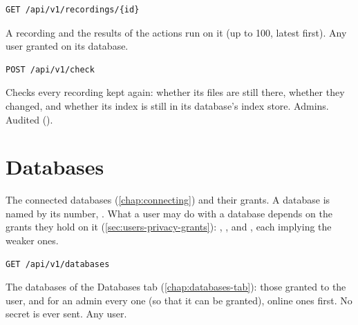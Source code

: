 \begin{lstlisting}[style=signature]
GET /api/v1/recordings/{id}
\end{lstlisting}
A recording and the results of the actions run on it (up to 100, latest first). Any user granted
 on its database.

\begin{lstlisting}[style=signature]
POST /api/v1/check
\end{lstlisting}
Checks every recording kept again: whether its files are still there, whether they changed, and
whether its index is still in its database's index store. Admins. Audited ().

\section{Databases}
\label{sec:http-api-databases}

The connected databases (\cref{chap:connecting}) and their grants. A database is named by its
number, . What a user may do with a database depends on the grants they hold on it
(\cref{sec:users-privacy-grants}): , ,  and ,
each implying the weaker ones.

\begin{lstlisting}[style=signature]
GET /api/v1/databases
\end{lstlisting}
The databases of the Databases tab (\cref{chap:databases-tab}): those granted to the user, and
for an admin every one (so that it can be granted), online ones first. No secret is ever sent.
Any user.

